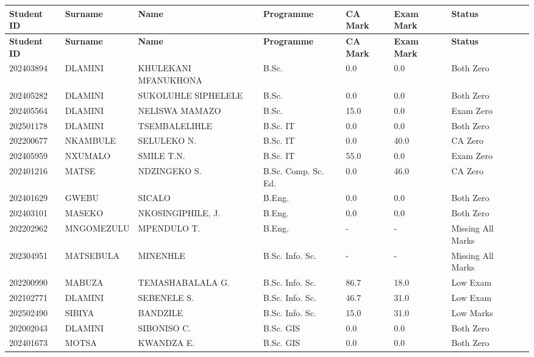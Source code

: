 \documentclass[12pt]{article}
\begin{document}
\begin{longtable}{@{}llllllll@{}}
\toprule
\textbf{Student ID} & \textbf{Surname} & \textbf{Name} & \textbf{Programme} & \textbf{CA Mark} & \textbf{Exam Mark} & \textbf{Status} \\
\midrule
\endfirsthead

\toprule
\textbf{Student ID} & \textbf{Surname} & \textbf{Name} & \textbf{Programme} & \textbf{CA Mark} & \textbf{Exam Mark} & \textbf{Status} \\
\midrule
\endhead

\bottomrule
\endfoot

202403894 & DLAMINI & KHULEKANI MFANUKHONA & B.Sc. & 0.0 & 0.0 & Both Zero \\
202405282 & DLAMINI & SUKOLUHLE SIPHELELE & B.Sc. & 0.0 & 0.0 & Both Zero \\
202405564 & DLAMINI & NELISWA MAMAZO & B.Sc. & 15.0 & 0.0 & Exam Zero \\

202501178 & DLAMINI & TSEMBALELIHLE & B.Sc. IT & 0.0 & 0.0 & Both Zero \\
202200677 & NKAMBULE & SELULEKO N. & B.Sc. IT & 0.0 & 40.0 & CA Zero \\
202405959 & NXUMALO & SMILE T.N. & B.Sc. IT & 55.0 & 0.0 & Exam Zero \\

202401216 & MATSE & NDZINGEKO S. & B.Sc. Comp. Sc. Ed. & 0.0 & 46.0 & CA Zero \\

202401629 & GWEBU & SICALO & B.Eng. & 0.0 & 0.0 & Both Zero \\
202403101 & MASEKO & NKOSINGIPHILE, J. & B.Eng. & 0.0 & 0.0 & Both Zero \\
202202962 & MNGOMEZULU & MPENDULO T. & B.Eng. & - & - & Missing All Marks \\

202304951 & MATSEBULA & MINENHLE & B.Sc. Info. Sc. & - & - & Missing All Marks \\
202200990 & MABUZA & TEMASHABALALA G. & B.Sc. Info. Sc. & 86.7 & 18.0 & Low Exam \\
202102771 & DLAMINI & SEBENELE S. & B.Sc. Info. Sc. & 46.7 & 31.0 & Low Exam \\
202502490 & SIBIYA & BANDZILE & B.Sc. Info. Sc. & 15.0 & 31.0 & Low Marks \\

202002043 & DLAMINI & SIBONISO C. & B.Sc. GIS & 0.0 & 0.0 & Both Zero \\
202401673 & MOTSA & KWANDZA E. & B.Sc. GIS & 0.0 & 0.0 & Both Zero \\

\end{longtable}
\end{document}
